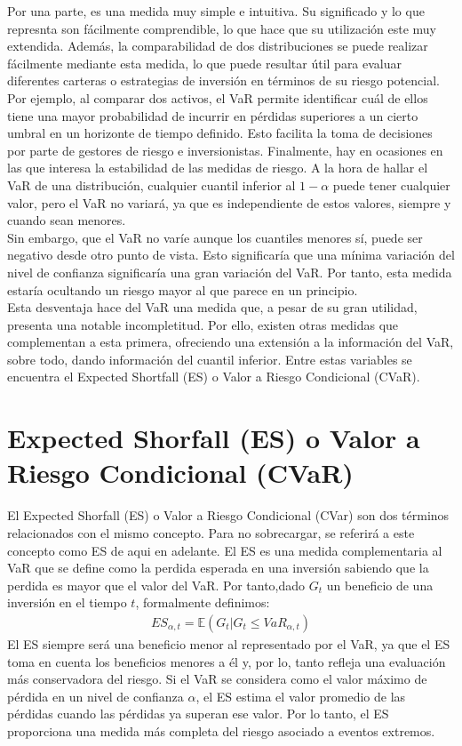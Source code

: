 \documentclass[11pt]{book}
\theoremstyle{plain} %
\theoremstyle{definition} %
\begin{document}
Por una parte, es una medida muy simple e intuitiva. Su significado y lo que 
represnta son fácilmente comprendible, lo que hace que su utilización este 
muy extendida. Además, la comparabilidad de dos distribuciones se puede 
realizar fácilmente mediante esta medida, lo que puede resultar útil para 
evaluar diferentes carteras o estrategias de inversión en términos de su riesgo 
potencial. Por ejemplo, al comparar dos activos, el VaR permite identificar 
cuál de ellos tiene una mayor probabilidad de incurrir en pérdidas superiores 
a un cierto umbral en un horizonte de tiempo definido. Esto facilita la toma 
de decisiones por parte de gestores de riesgo e inversionistas. Finalmente, 
hay en ocasiones en las que interesa la estabilidad de las medidas de riesgo. 
A la hora de hallar el VaR de una distribución, cualquier cuantil inferior al 
$1-\alpha$ puede tener cualquier valor, pero el VaR no variará, ya que es 
independiente de estos valores, siempre y cuando sean menores.\\

Sin embargo, que el VaR no varíe aunque los cuantiles menores sí, puede ser 
negativo desde otro punto de vista. Esto significaría que una mínima variación 
del nivel de confianza significaría una gran variación del VaR. Por tanto, esta 
medida estaría ocultando un riesgo mayor al que parece en un principio. \\

Esta desventaja hace del VaR una medida que, a pesar de su gran utilidad, 
presenta una notable incompletitud. Por ello, existen otras medidas que 
complementan a esta primera, ofreciendo una extensión a la información del 
VaR, sobre todo, dando información del cuantil inferior. Entre estas 
variables se encuentra el Expected Shortfall (ES) o Valor a Riesgo
Condicional (CVaR). 

\section{Expected Shorfall (ES) o Valor a Riesgo Condicional (CVaR)}
El Expected Shorfall (ES) o Valor a Riesgo Condicional (CVar) son dos términos
relacionados con el mismo concepto. Para no sobrecargar, se referirá a este 
concepto como ES de aqui en adelante. El ES es una medida complementaria 
al VaR que se define como la perdida esperada en una inversión sabiendo 
que la perdida es mayor que el valor del VaR. Por tanto,dado $G_t$ un 
beneficio de una inversión en el tiempo $t$, formalmente definimos:
\begin{align*}
    ES_{\alpha, t} = \mathbb{E}(G_t|G_t \leq VaR_{\alpha, t})
\end{align*}
El ES siempre será una beneficio menor al representado por el VaR, ya que 
el ES toma en cuenta los beneficios menores a él y, por lo, tanto refleja una 
evaluación más conservadora del riesgo. Si el VaR se considera como el 
valor máximo de pérdida en un nivel de confianza $\alpha$, el ES estima 
el valor promedio de las pérdidas cuando las pérdidas ya superan ese valor. 
Por lo tanto, el ES proporciona una medida más completa del riesgo 
asociado a eventos extremos.
\end{document}
